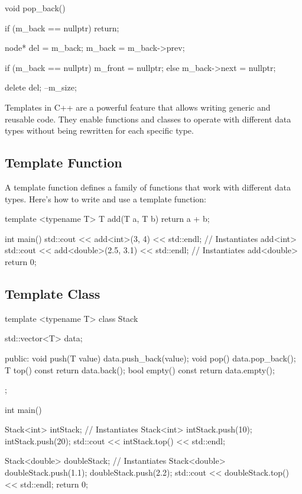 \documentclass{report}
\begin{document}
    \pagebreak 
    \begin{cppcode}
    void pop_back() {
        if (m_back == nullptr) return;

        node* del = m_back;
        m_back = m_back->prev;

        if (m_back == nullptr) {
            m_front = nullptr;
        } else {
            m_back->next = nullptr;
        }

        delete del;
        --m_size;
    }
    \end{cppcode}

    \pagebreak 
    \bigbreak \noindent 
    Templates in C++ are a powerful feature that allows writing generic and reusable code. They enable functions and classes to operate with different data types without being rewritten for each specific type.
    \bigbreak \noindent 
    \subsection{Template Function}
    \bigbreak \noindent 
    A template function defines a family of functions that work with different data types. Here's how to write and use a template function:
    \bigbreak \noindent 
    \begin{cppcode}
template <typename T>
T add(T a, T b) {
    return a + b;
}

int main() {
    std::cout << add<int>(3, 4) << std::endl; // Instantiates add<int>
    std::cout << add<double>(2.5, 3.1) << std::endl; // Instantiates add<double>
    return 0;
}
    \end{cppcode}

    \bigbreak \noindent 
    \pagebreak 
    \subsection{Template Class}
    \bigbreak \noindent 
    \begin{cppcode}
template <typename T>
class Stack {
    std::vector<T> data;

public:
    void push(T value) {
        data.push_back(value);
    }
    void pop() {
        data.pop_back();
    }
    T top() const {
        return data.back();
    }
    bool empty() const {
        return data.empty();
    }
};

int main() {
    Stack<int> intStack; // Instantiates Stack<int>
    intStack.push(10);
    intStack.push(20);
    std::cout << intStack.top() << std::endl;

    Stack<double> doubleStack; // Instantiates Stack<double>
    doubleStack.push(1.1);
    doubleStack.push(2.2);
    std::cout << doubleStack.top() << std::endl;
    return 0;
}
    \end{cppcode}
\end{document}
